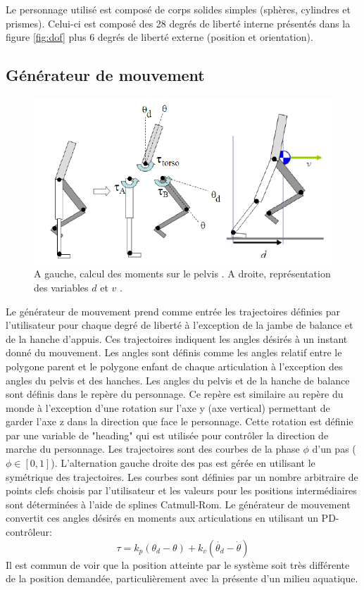 \documentclass{llncs}
\begin{document}
Le personnage utilisé est composé de corps solides simples (sphères, cylindres et prismes). Celui-ci est composé des 28 degrés de liberté interne présentés dans la figure \ref{fig:dof} plus 6 degrés de liberté externe (position et orientation).

%
\subsection{Générateur de mouvement}
\begin{figure}[h]
\centering
\includegraphics[scale=0.5]{stance_torque_and_v_and_d.png}
\caption{A gauche, calcul des moments sur le pelvis \cite{yin2007simbicon}. A droite, représentation des variables \(d\) et \(v\) \cite{yin2007simbicon}.}
\label{fig:torques_pelvis}
\label{fig:d_and_v}
\end{figure}
Le générateur de mouvement prend comme entrée les trajectoires définies par l'utilisateur pour chaque degré de liberté à l'exception de la jambe de balance et de la hanche d'appuis. Ces trajectoires indiquent les angles désirés à un instant donné du mouvement. Les angles sont définis comme les angles relatif entre le polygone parent et le polygone enfant de chaque articulation à l'exception des angles du pelvis et des hanches. Les angles du pelvis et de la hanche de balance sont définis dans le repère du personnage. Ce repère est similaire au repère du monde à l'exception d'une rotation sur l'axe y (axe vertical) permettant de garder l'axe z dans la direction que face le personnage. Cette rotation est définie par une variable de "heading" qui est utilisée pour contrôler la direction de marche du personnage. Les trajectoires sont des courbes de la phase \(\phi \) d'un pas (\(\phi \in [0,1] \)). L'alternation gauche droite des pas est gérée en utilisant le symétrique des trajectoires. Les courbes sont définies par un nombre arbitraire de points clefs choisis par l'utilisateur et les valeurs pour les positions intermédiaires sont déterminées à l'aide de splines Catmull-Rom.
Le générateur de mouvement convertit ces angles désirés en moments aux articulations en utilisant un PD-contrôleur:
\[
\tau=k_p(\theta_d - \theta) + k_v(\dot{\theta_d} - \dot{\theta})
\]
Il est commun de voir que la position atteinte par le système soit très différente de la position demandée, particulièrement avec la présente d'un milieu aquatique. 
\end{document}
